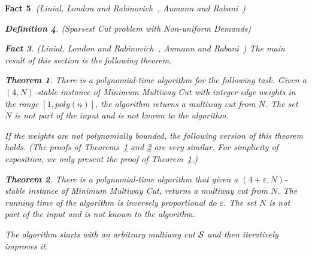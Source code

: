 \documentclass[twoside,leqno,twocolumn]{article}
\newtheorem{theorem}{Theorem}[section]
\newtheorem{Definition}[theorem]{Definition}
\newtheorem{fact}[theorem]{Fact}
\begin{document}
\begin{fact}{\sc (Linial, London and Rabinovich~\cite{LLR}, Aumann and Rabani~\cite{AR})}
\begin{Definition} {\sc (Sparsest Cut problem with Non-uniform Demands)}
\begin{fact}{\sc (Linial, London and Rabinovich~\cite{LLR}, Aumann and Rabani~\cite{AR})}
\noindent The main result of this section is the following theorem.
\begin{theorem}\label{thm:weakly-stable-multiway-prime}
There is a polynomial-time algorithm for the following task.
Given a $(4, N)$-stable instance of Minimum Multiway Cut with integer edge weights in the range $[1, poly(n)]$,
the algorithm returns a multiway cut from $N$.
The set $N$ is not part of the input and is not known to the algorithm.
\end{theorem}
If the weights are not polynomially bounded, the following version of this theorem holds. (The proofs of Theorems~\ref{thm:weakly-stable-multiway-prime} and \ref{thm:weakly-stable-multiway} are very similar. For simplicity of exposition, we only present the proof of Theorem~\ref{thm:weakly-stable-multiway-prime}.)
\begin{theorem}\label{thm:weakly-stable-multiway}
There is a polynomial-time algorithm that given a $(4 + \varepsilon, N)$-stable instance of Minimum Multiway Cut, returns a multiway
cut from $N$. The running time of the algorithm is inversely proportional do $\varepsilon$.
The set $N$ is not part of the input and is not known to the algorithm.
\end{theorem}

The algorithm starts with an arbitrary multiway cut $\cal S$ and then iteratively improves it.


\end{fact}
\end{Definition}
\end{fact}
\end{document}
